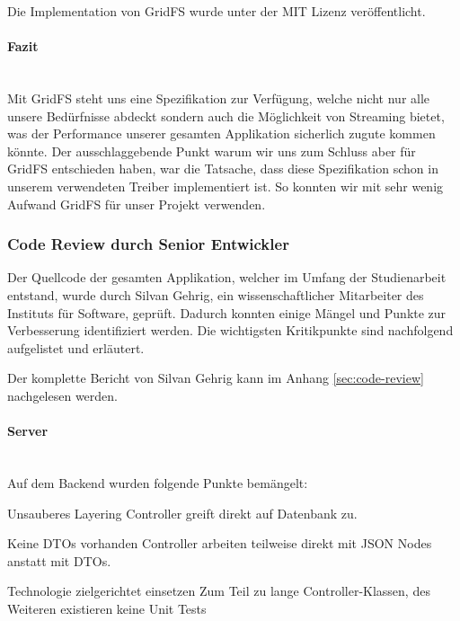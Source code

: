 Die Implementation von GridFS wurde unter der MIT Lizenz veröffentlicht.

\paragraph{Fazit}~\\
Mit GridFS steht uns eine Spezifikation zur Verfügung, welche nicht nur alle unsere Bedürfnisse abdeckt sondern auch die Möglichkeit von Streaming bietet, was der Performance unserer gesamten Applikation sicherlich zugute kommen könnte. Der ausschlaggebende Punkt warum wir uns zum Schluss aber für GridFS entschieden haben, war die Tatsache, dass diese Spezifikation schon in unserem verwendeten Treiber implementiert ist. So konnten wir mit sehr wenig Aufwand GridFS für unser Projekt verwenden.
\newpage

\subsubsection{Code Review durch Senior Entwickler}
Der Quellcode der gesamten Applikation, welcher im Umfang der Studienarbeit entstand, wurde durch Silvan Gehrig, ein wissenschaftlicher Mitarbeiter des Instituts für Software, geprüft. Dadurch konnten einige Mängel und Punkte zur Verbesserung identifiziert werden. Die wichtigsten Kritikpunkte sind nachfolgend aufgelistet und erläutert.

Der komplette Bericht von Silvan Gehrig kann im Anhang \ref{sec:code-review} nachgelesen werden.

\paragraph{Server}~\\
Auf dem Backend wurden folgende Punkte bemängelt:
\begin{basedescript}{
		\desclabelstyle{\multilinelabel}
		\desclabelwidth{4.5cm}
		\setlength{\itemsep}{5ex}}
		\item[Unsauberes Layering] Controller greift direkt auf Datenbank zu.
		\item[Keine DTOs vorhanden] Controller arbeiten teilweise direkt mit JSON Nodes anstatt mit DTOs.
		
		\item[Technologie zielgerichtet einsetzen] Zum Teil zu lange Controller-Klassen, des Weiteren existieren keine Unit Tests
		
\end{basedescript}
